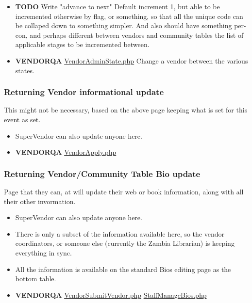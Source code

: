 \documentclass[captions=tablesignature]{scrartcl}
\begin{document}
\begin{itemize}
\item {\bfseries\sffamily TODO} Write "advance to next"
\label{sec-3-1-5-14}
Default increment 1, but able to be incremented otherwise by
flag, or something, so that all the unique code can be collaped
down to something simpler.  And also should have something
per-con, and perhaps different between vendors and community
tables the list of applicable stages to be incremented between.

\item {\bfseries\sffamily VENDORQA} \href{../webpages/VendorAdminState.php}{VendorAdminState.php}
\label{sec-3-1-5-15}
Change a vendor between the various states.
\end{itemize}

\subsubsection{Returning Vendor informational update}
\label{sec-3-1-6}
This might not be necessary, based on the above page keeping what
is set for this event as set.
\begin{itemize}
\item SuperVendor can also update anyone here.
\end{itemize}
\begin{itemize}
\item {\bfseries\sffamily VENDORQA} \href{../webpages/VendorApply.php}{VendorApply.php}
\label{sec-3-1-6-1}
\end{itemize}

\subsubsection{Returning Vendor/Community Table Bio update}
\label{sec-3-1-7}
Page that they can, at will update their web or book information,
along with all their other invormation.
\begin{itemize}
\item SuperVendor can also update anyone here.
\item There is only a subset of the information available here, so
the vendor coordinators, or someone else (currently the Zambia
Librarian) is keeping everything in sync.
\item All the information is available on the standard Bios editing
page as the bottom table.
\end{itemize}
\begin{itemize}
\item {\bfseries\sffamily VENDORQA} \href{../webpages/VendorSubmitVendor.php}{VendorSubmitVendor.php} \href{../webpages/StaffManageBios.php}{StaffManageBios.php}
\label{sec-3-1-7-1}
\end{itemize}
\end{document}
